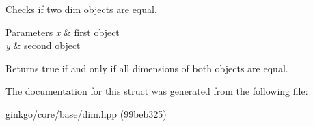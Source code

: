 Checks if two dim objects are equal. 


\begin{DoxyParams}{Parameters}
{\em x} & first object \\
\hline
{\em y} & second object\\
\hline
\end{DoxyParams}
\begin{DoxyReturn}{Returns}
true if and only if all dimensions of both objects are equal. 
\end{DoxyReturn}


The documentation for this struct was generated from the following file\+:\begin{DoxyCompactItemize}
\item 
ginkgo/core/base/dim.\+hpp (99beb325)\end{DoxyCompactItemize}

